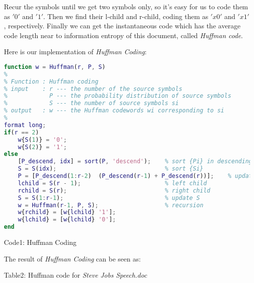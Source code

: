 \documentclass[12pt]{article} %
\numberwithin{equation}{section}
\begin{document}
Recur the symbols until we get two symbols only, so it's easy for us to code them as $'0'$ and $'1'$. Then we find their l-child and r-child, coding them as $'x0'$ and $'x1'$, respectively. Finally we can get the instantaneous code which has the average code length near to information entropy of this document, called \emph{Huffman code}.

\vspace{1\baselineskip}
Here is our implementation of \emph{Huffman Coding}:
\newpage
\begin{lstlisting}[language=matlab]
function w = Huffman(r, P, S)
%
% Function : Huffman coding
% input    : r --- the number of the source symbols
%            P --- the probability distribution of source symbols
%            S --- the number of source symbols si
% output   : w --- the Huffman codewords wi corresponding to si
%
format long;
if(r == 2)
    w{S(1)} = '0';
    w{S(2)} = '1';
else
    [P_descend, idx] = sort(P, 'descend');    % sort {Pi} in descending order
    S = S(idx);                               % sort {Si}
    P = [P_descend(1:r-2)  (P_descend(r-1) + P_descend(r))];    % update P
    lchild = S(r - 1);                        % left child
    rchild = S(r);                            % right child
    S = S(1:r-1);                             % update S
    w = Huffman(r-1, P, S);                   % recursion
    w{rchild} = [w{lchild} '1'];
    w{lchild} = [w{lchild} '0'];
end
\end{lstlisting}
\begin{center}
  Code1: Huffman Coding
\end{center}

The result of \emph{Huffman Coding} can be seen as:

\begin{center}
  Table2: Huffman code for \emph{Steve Jobs Speech.doc}
\end{center}
\end{document}
